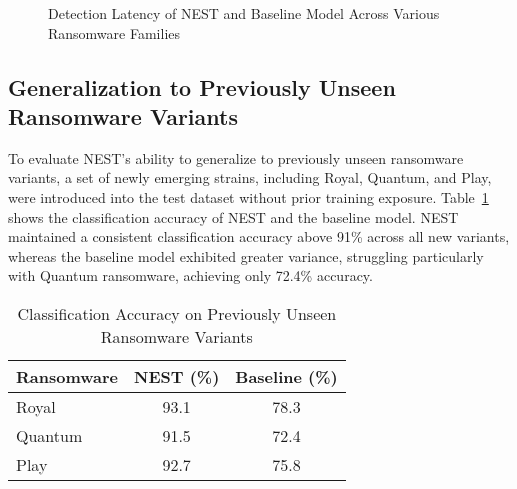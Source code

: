 \documentclass[lettersize,journal]{IEEEtran}
\begin{document}
\begin{figure}[h]
	\centering
	\caption{Detection Latency of NEST and Baseline Model Across Various Ransomware Families}
	\label{fig:detection_latency}
\end{figure}

\subsection{Generalization to Previously Unseen Ransomware Variants}

To evaluate NEST’s ability to generalize to previously unseen ransomware variants, a set of newly emerging strains, including Royal, Quantum, and Play, were introduced into the test dataset without prior training exposure. Table~\ref{tab:generalization} shows the classification accuracy of NEST and the baseline model. NEST maintained a consistent classification accuracy above 91\% across all new variants, whereas the baseline model exhibited greater variance, struggling particularly with Quantum ransomware, achieving only 72.4\% accuracy.

\begin{table}[h]
	\centering
	\caption{Classification Accuracy on Previously Unseen Ransomware Variants}
	\label{tab:generalization}
	\begin{tabular}{|l|c|c|}
		\hline
		\textbf{Ransomware} & \textbf{NEST (\%)} & \textbf{Baseline (\%)} \\
		\hline
		Royal & 93.1 & 78.3 \\
		Quantum & 91.5 & 72.4 \\
		Play & 92.7 & 75.8 \\
		\hline
	\end{tabular}
\end{table}
\end{document}
